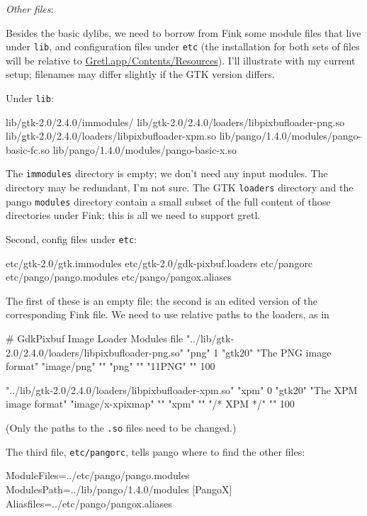 \documentclass{article}
\begin{document}
\textit{Other files}: 

Besides the basic dylibs, we need to borrow from Fink some module
files that live under \texttt{lib}, and configuration files under
\texttt{etc} (the installation for both sets of files will be relative
to \url{Gretl.app/Contents/Resources}).  I'll illustrate with my
current setup; filenames may differ slightly if the GTK version
differs.

Under \texttt{lib}:

\begin{code}
lib/gtk-2.0/2.4.0/immodules/
lib/gtk-2.0/2.4.0/loaders/libpixbufloader-png.so
lib/gtk-2.0/2.4.0/loaders/libpixbufloader-xpm.so
lib/pango/1.4.0/modules/pango-basic-fc.so  
lib/pango/1.4.0/modules/pango-basic-x.so
\end{code}

The \texttt{immodules} directory is empty; we don't need any input
modules.  The directory may be redundant, I'm not sure.  The GTK
\texttt{loaders} directory and the pango \texttt{modules} directory
contain a small subset of the full content of those directories under
Fink; this is all we need to support gretl. 

Second, config files under \texttt{etc}:

\begin{code}
etc/gtk-2.0/gtk.immodules
etc/gtk-2.0/gdk-pixbuf.loaders
etc/pangorc
etc/pango/pango.modules
etc/pango/pangox.aliases
\end{code}

The first of these is an empty file; the second is an edited
version of the corresponding Fink file.  We need to use relative
paths to the loaders, as in

\begin{code}
# GdkPixbuf Image Loader Modules file
"../lib/gtk-2.0/2.4.0/loaders/libpixbufloader-png.so"
"png" 1 "gtk20" "The PNG image format"
"image/png" ""
"png" ""
"\211PNG\r\n{}\n" "" 100

"../lib/gtk-2.0/2.4.0/loaders/libpixbufloader-xpm.so"
"xpm" 0 "gtk20" "The XPM image format"
"image/x-xpixmap" ""
"xpm" ""
"/* XPM */" "" 100
\end{code}

(Only the paths to the \texttt{.so} files need to be changed.)

The third file, \texttt{etc/pangorc}, tells pango where to find the
other files:

\begin{code}
[Pango]
ModuleFiles=../etc/pango/pango.modules
ModulesPath=../lib/pango/1.4.0/modules
[PangoX]
Aliasfiles=../etc/pango/pangox.aliases
\end{code}
\end{document}
